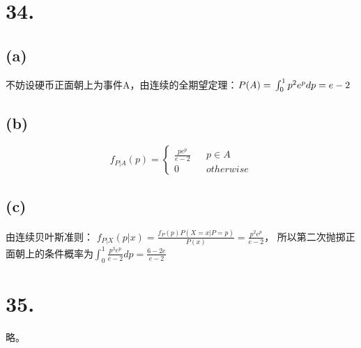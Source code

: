\documentclass[UTF8]{report}
\begin{document}
    \section*{34.}
        \subsection*{(a)}
            不妨设硬币正面朝上为事件A，由连续的全期望定理：$P(A) =\\ \int_{0}^{1}p^2e^pdp = e - 2$
        \subsection*{(b)}
            $$f_{P|A}(p) = \left\{
                \begin{array}{lcr}
                    \frac{pe^p}{e - 2} & & p \in A\\
                    0 & & otherwise
                \end{array}
            \right.$$
        \subsection*{(c)}
            由连续贝叶斯准则：
            $f_{P|X}(p|x) = \frac{f_{P}(p)P(X = x|P = p)}{P(x)} = \frac{p^2e^p}{e - 2}$，
            所以第二次抛掷正面朝上的条件概率为$\int_{0}^{1}\frac{p^3e^p}{e - 2}dp = \frac{6 - 2e}{e - 2}$
    \section*{35.}
        略。
\end{document}
